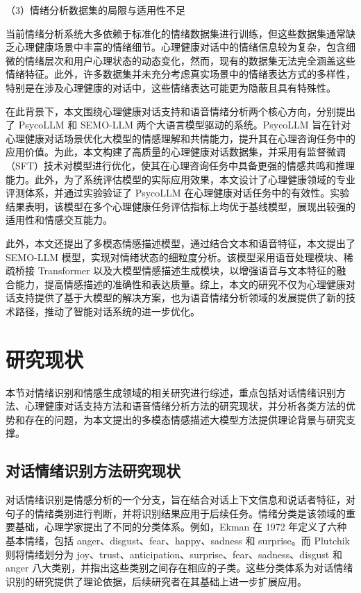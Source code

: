 （3）情绪分析数据集的局限与适用性不足

当前情绪分析系统大多依赖于标准化的情绪数据集进行训练，但这些数据集通常缺乏心理健康场景中丰富的情绪细节。心理健康对话中的情绪信息较为复杂，包含细微的情绪层次和用户心理状态的动态变化，然而，现有的数据集无法完全涵盖这些情绪特征。此外，许多数据集并未充分考虑真实场景中的情绪表达方式的多样性，特别是在涉及心理健康的对话中，这些情绪表达可能更为隐蔽且具有特殊性。

\vspace{1em}

在此背景下，本文围绕心理健康对话支持和语音情绪分析两个核心方向，分别提出了 PsycoLLM 和 SEMO-LLM 两个大语言模型驱动的系统。PsycoLLM 旨在针对心理健康对话场景优化大模型的情感理解和共情能力，提升其在心理咨询任务中的应用价值。为此，本文构建了高质量的心理健康对话数据集，并采用有监督微调（SFT）技术对模型进行优化，使其在心理咨询任务中具备更强的情感共鸣和推理能力。此外，为了系统评估模型的实际应用效果，本文设计了心理健康领域的专业评测体系，并通过实验验证了 PsycoLLM 在心理健康对话任务中的有效性。实验结果表明，该模型在多个心理健康任务评估指标上均优于基线模型，展现出较强的适用性和情感交互能力。

此外，本文还提出了多模态情感描述模型，通过结合文本和语音特征，本文提出了 SEMO-LLM 模型，实现对情绪状态的细粒度分析。该模型采用语音处理模块、稀疏桥接 Transformer 以及大模型情感描述生成模块，以增强语音与文本特征的融合能力，提高情感描述的准确性和表达质量。综上，本文的研究不仅为心理健康对话支持提供了基于大模型的解决方案，也为语音情绪分析领域的发展提供了新的技术路径，推动了智能对话系统的进一步优化。

\section{研究现状}

本节对情绪识别和情感生成领域的相关研究进行综述，重点包括对话情绪识别方法、心理健康对话支持方法和语音情绪分析方法的研究现状，并分析各类方法的优势和存在的问题，为本文提出的多模态情感描述大模型方法提供理论背景与研究支撑。

\subsection{对话情绪识别方法研究现状}

对话情绪识别是情感分析的一个分支，旨在结合对话上下文信息和说话者特征，对句子的情绪类别进行判断，并将识别结果应用于后续任务。情绪分类是该领域的重要基础，心理学家提出了不同的分类体系。例如，Ekman\cite{Ekman_1993} 在 1972 年定义了六种基本情绪，包括 anger、disgust、fear、happy、sadness 和 surprise。而 Plutchik\cite{Plutchik_1982} 则将情绪划分为 joy、trust、anticipation、surprise、fear、sadness、disgust 和 anger 八大类别，并指出这些类别之间存在相应的子类。这些分类体系为对话情绪识别的研究提供了理论依据，后续研究者在其基础上进一步扩展应用。


